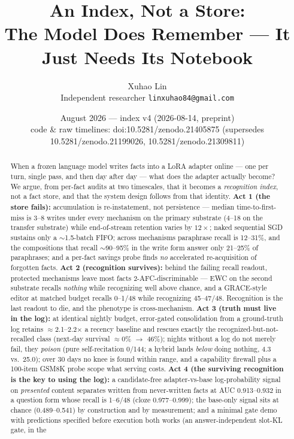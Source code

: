 \documentclass[11pt]{article}
\title{An Index, Not a Store:\\ \large The Model Does Remember --- It Just Needs Its Notebook}
\author{Xuhao Lin\\ \small Independent researcher \quad \texttt{linxuhao84@gmail.com}}
\date{August 2026 --- index v4 (2026-08-14, preprint)\\ \small code \& raw timelines: doi:10.5281/zenodo.21405875 (supersedes 10.5281/zenodo.21199026, 10.5281/zenodo.21309811)}
\begin{document}
\maketitle

\begin{abstract}
When a frozen language model writes facts into a LoRA adapter online --- one per turn, single
pass, and then day after day --- what does the adapter actually become? We argue, from per-fact
audits at two timescales, that it becomes a \emph{recognition index}, not a fact store, and that
the system design follows from that identity. \textbf{Act 1 (the store fails):} accumulation is
re-instatement, not persistence --- median time-to-first-miss is 3--8 writes under every mechanism
on the primary substrate (4--18 on the transfer substrate) while
end-of-stream retention varies by $12\times$; naked sequential SGD sustains only a
$\sim$1.5-batch FIFO; across mechanisms paraphrase recall is 12--31\%, and the compositions that
recall $\sim$90--95\% in the write form answer only 21--25\% of paraphrases; and a per-fact savings probe finds \emph{no} accelerated re-acquisition
of forgotten facts. \textbf{Act 2 (recognition survives):} behind the failing recall readout,
protected mechanisms leave most facts 2-AFC-discriminable --- EWC on the second substrate recalls
\emph{nothing} while recognizing well above chance, and a GRACE-style editor at matched budget
recalls 0--1/48 while recognizing 45--47/48. Recognition is the last readout to die, and the
phenotype is cross-mechanism. \textbf{Act 3 (truth must live in the log):} at identical nightly
budget, error-gated consolidation from a ground-truth log retains $\approx$2.1--2.2$\times$ a recency baseline
and rescues exactly the recognized-but-not-recalled class (next-day survival $\approx$0\% $\to$ 46\%);
nights without a log do not merely fail, they \emph{poison} (pure self-recitation 0/144; a hybrid
lands \emph{below} doing nothing, 4.3 vs.\ 25.0); over 30 days no knee is found within range, and
a capability firewall plus a 100-item GSM8K probe scope what serving costs. \textbf{Act 4 (the
surviving recognition is the key to using the log):} a candidate-free adapter-vs-base log-probability
signal on \emph{presented} content separates written from never-written facts at AUC
0.913--0.932 in a question form whose recall is 1--6/48 (cloze 0.977--0.999); the base-only
signal sits at chance (0.489--0.541) by construction and by measurement; and a minimal
gate demo with predictions specified before execution both works (an answer-independent slot-KL gate, in the

\end{abstract}
\end{document}
